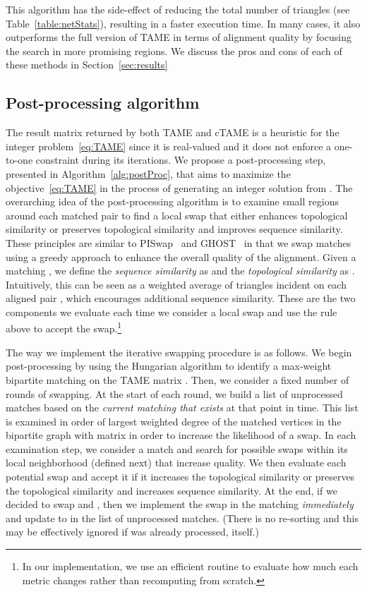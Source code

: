 \documentclass[10pt, journal, compsoc, final]{IEEEtran}
\begin{document}
This algorithm has the side-effect of reducing the total number of triangles (see Table~\ref{table:netStats}), 
resulting in a faster execution time. In many cases, 
it also outperforms the full version of TAME in terms of alignment quality by focusing the search
in more promising regions. 
We discuss the pros and cons of each of these methods in Section~\ref{sec:results}


\subsection{Post-processing algorithm}

The result matrix  returned by both TAME and cTAME is a heuristic for the integer problem~\eqref{eq:TAME} since it is real-valued and it does not enforce a one-to-one constraint during its
iterations. We propose a post-processing step, presented in Algorithm~\ref{alg:postProc}, that aims to maximize the objective~\eqref{eq:TAME} in the process of generating an integer solution from . The overarching idea of the post-processing algorithm is to examine small regions around each matched pair to find a local swap that either enhances topological similarity or preserves topological similarity and improves sequence similarity. These principles are similar to PISwap~\cite{PISWAP} and GHOST~\cite{GHOST} in that we swap matches using a greedy approach
to enhance the overall quality of the alignment.  Given a matching , we define the \emph{sequence similarity} as  and the \emph{topological similarity} as . Intuitively, this can be seen as a weighted average of triangles incident on each aligned pair , which encourages additional sequence similarity. These are the two components we evaluate each time we consider a local swap and use the rule above to accept the swap.\footnote{In our implementation, we use an efficient routine to evaluate how much each metric changes rather than recomputing from scratch.} 

The way we implement the iterative swapping procedure is as follows. We begin post-processing by using the Hungarian algorithm to identify a max-weight bipartite matching on the TAME matrix . Then, we consider a fixed number of rounds of swapping. At the start of each round, we build a list of unprocessed matches based on the \emph{current matching that exists} at that point in time. This list is examined in order of largest weighted degree of the matched vertices in the bipartite graph with matrix  in order to increase the likelihood of a swap.  In each examination step, we consider a match  and search for possible swaps within its local neighborhood (defined next) that increase quality. We then evaluate each potential swap and accept it if it increases the topological similarity or preserves the topological similarity and increases sequence similarity. At the end, if we decided to swap  and , then we implement the swap in the matching \emph{immediately} and update  to  in the list of unprocessed matches. (There is no re-sorting and this may be effectively  ignored if  was already processed, itself.) 
\end{document}

